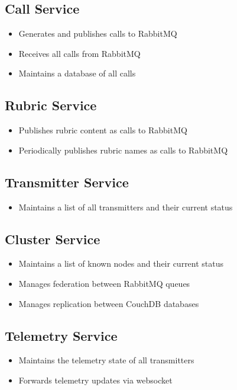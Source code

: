 \subsection{Call Service}
\begin{itemize}
\item Generates and publishes calls to RabbitMQ
\item Receives all calls from RabbitMQ
\item Maintains a database of all calls
\end{itemize}

\subsection{Rubric Service}
\begin{itemize}
\item Publishes rubric content as calls to RabbitMQ
\item Periodically publishes rubric names as calls to RabbitMQ
\end{itemize}

\subsection{Transmitter Service}
\begin{itemize}
\item Maintains a list of all transmitters and their current status
\end{itemize}

\subsection{Cluster Service}
\begin{itemize}
\item Maintains a list of known nodes and their current status
\item Manages federation between RabbitMQ queues
\item Manages replication between CouchDB databases
\end{itemize}

\subsection{Telemetry Service}
\begin{itemize}
\item Maintains the telemetry state of all transmitters
\item Forwards telemetry updates via websocket
\end{itemize}

